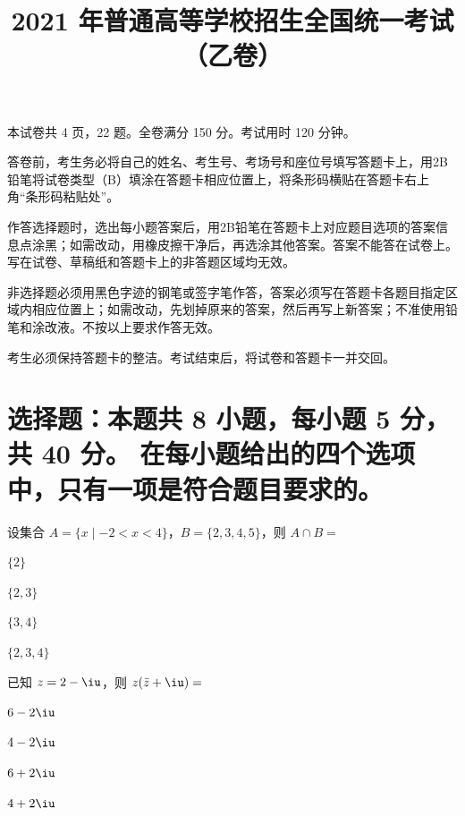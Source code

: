 \documentclass{exam-zh}
\title{2021 年普通高等学校招生全国统一考试（乙卷）}
\begin{document}

\secret

\maketitle

本试卷共 4 页，22 题。全卷满分 150 分。考试用时 120 分钟。


\begin{notice}
  \item 答卷前，考生务必将自己的姓名、考生号、考场号和座位号填写答题卡上，用2B铅笔将试卷类型（B）填涂在答题卡相应位置上，将条形码横贴在答题卡右上角“条形码粘贴处”。
  \item 作答选择题时，选出每小题答案后，用2B铅笔在答题卡上对应题目选项的答案信息点涂黑；如需改动，用橡皮擦干净后，再选涂其他答案。答案不能答在试卷上。
    写在试卷、草稿纸和答题卡上的非答题区域均无效。
  \item 非选择题必须用黑色字迹的钢笔或签字笔作答，答案必须写在答题卡各题目指定区域内相应位置上；如需改动，先划掉原来的答案，然后再写上新答案；不准使用铅笔和涂改液。不按以上要求作答无效。
  \item 考生必须保持答题卡的整洁。考试结束后，将试卷和答题卡一并交回。
\end{notice}



\section{%
  选择题：本题共 8 小题，每小题 5 分，共 40 分。
  在每小题给出的四个选项中，只有一项是符合题目要求的。
}

\begin{question}[points = 2]
  设集合 $A = \{x \mid -2 < x < 4\}$，$B = \{2, 3, 4, 5\}$，则 $A \cap B = $ \paren[B]

  \begin{choices}
    \item $\{2\}$
    \item $\{2, 3\}$
    \item $\{3, 4\}$
    \item $\{2, 3, 4\}$
  \end{choices}
\end{question}

\begin{question}
  已知 $z = 2 - \iu$，则 $z (\bar{z} + \iu) = $ \paren[C]
  \begin{choices}
    \item $6 - 2\iu$
    \item $4 - 2\iu$
    \item $6 + 2\iu$
    \item $4 + 2\iu$
  \end{choices}
\end{question}
\end{document}
